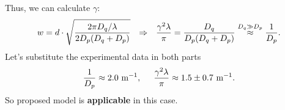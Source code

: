 Thus, we can calculate $\gamma$:
\begin{equation*}
    w = d \cdot \sqrt{\frac{2 \pi D_q / \lambda}{2 D_p (D_q + D_p)}} \hspace{0.25cm} \Rightarrow \hspace{0.25cm}
    \frac{\gamma^2 \lambda}{\pi} = \frac{D_q}{D_p (D_q + D_p)}
    \overset{D_q \gg D_p}{\approx} \frac{1}{D_p}.
\end{equation*}
Let's substitute the experimental data in both parts
\begin{equation*}
    \frac{1}{D_p} \approx 2.0 \ \text{m}^{-1},
    \hspace{5mm}
    \frac{\gamma^2 \lambda}{\pi} \approx 1.5 \pm 0.7\ \text{m}^{-1}.
\end{equation*}
So proposed model is \textbf{applicable} in this case.